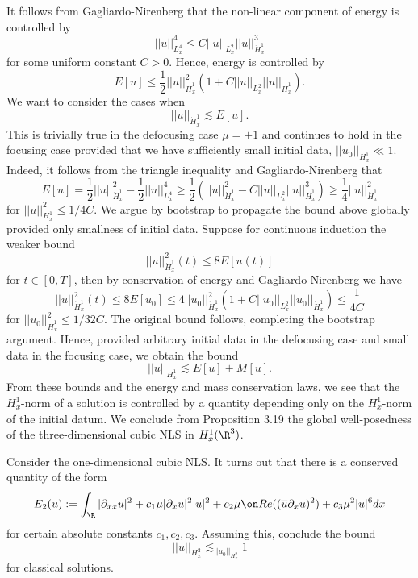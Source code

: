 \begin{solution}
	It follows from Gagliardo-Nirenberg that the non-linear component of energy is controlled by 
		\[ ||u||_{L^4_x}^4 \leq C ||u||_{L^2_x} ||u||_{\dot H^1_x}^3  \]
	for some uniform constant $C > 0$. Hence, energy is controlled by 
		\[ E[u] \leq \frac12 ||u||_{\dot H^1_x}^2 (1 + C ||u||_{L^2_x} ||u||_{\dot H^1_x}). \]	
	We want to consider the cases when
		\[ ||u||_{\dot H^1_x} \lesssim E[u]. \]
	This is trivially true in the defocusing case $\mu = +1$ and continues to hold in the	focusing case provided that we have sufficiently small initial data, $||u_0||_{H^1_x} \ll 1$. Indeed, it follows from the triangle inequality and Gagliardo-Nirenberg that 
		\[ E[u] = \frac12 ||u||_{\dot H^1_x}^2 - \frac12 ||u||_{L^4_x}^4 \geq  \frac12 \left( ||u||_{\dot H^1_x}^2 - C ||u||_{L^2_x} ||u||_{\dot H^1_x}^3 \right) \geq \frac14 ||u||_{\dot H^1_x}^2\]
	for $||u||_{H^1_x}^2 \leq 1/4C$. We argue by bootstrap to propagate the bound above globally provided only smallness of initial data. Suppose for continuous induction the weaker bound
		\[ ||u||_{\dot H^1_x}^2(t) \leq 8 E[u(t)]  \]
	for $t \in [0, T]$, then by conservation of energy and Gagliardo-Nirenberg we have
		\[ ||u||_{\dot H^1_x}^2 (t) \leq 8 E[u_0] \leq 4 ||u_0||_{\dot H^1_x}^2 (1 + C||u_0||_{L^2_x} ||u_0||_{\dot H^1_x}) \leq \frac{1}{4C} \]
	for $||u_0||_{\dot H^1_x}^2 \leq 1/32C$. The original bound follows, completing the bootstrap argument. Hence, provided arbitrary initial data in the defocusing case and small data in the focusing case, we obtain the bound
		\[ ||u||_{H^1_x} \lesssim E[u] + M[u]. \]	
	From these bounds and the energy and mass conservation laws, we see that the $H^1_x$-norm of a solution is controlled by a quantity depending only on the $H^1_x$-norm of the initial datum. We conclude from Proposition 3.19 the global well-posedness of the three-dimensional cubic NLS in $H^1_x (\R^3)$. 
\end{solution}

\begin{statement}
	Consider the one-dimensional cubic NLS. It turns out that there is a conserved quantity of the form
		\[ E_2 (u) := \int_\R |\partial_{xx} u|^2 + c_1 \mu |\partial_x u|^2 |u|^2 + c_2 \mu \Re ((\overline u \partial_x u)^2) + c_3 \mu^2 |u|^6 dx \]
	for certain absolute constants $c_1, c_2, c_3$. Assuming this, conclude the bound
		\[ ||u||_{H^2_x } \lesssim_{||u_0||_{H^2_x}} 1\]
	for classical solutions. 		
\end{statement}

